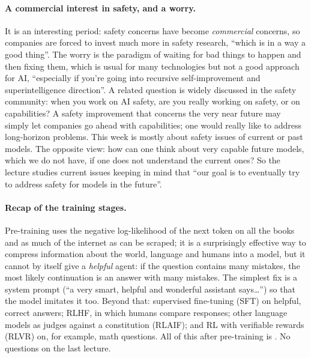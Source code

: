 \paragraph{A commercial interest in safety, and a worry.}
It is an interesting period: safety concerns have become \emph{commercial} concerns, so companies are forced to invest much more in safety research, ``which is in a way a good thing''. The worry is the paradigm of waiting for bad things to happen and then fixing them, which is usual for many technologies but not a good approach for AI, ``especially if you're going into recursive self-improvement and superintelligence direction''.
A related question is widely discussed in the safety community: when you work on AI safety, are you really working on safety, or on capabilities? A safety improvement that concerns the very near future may simply let companies go ahead with capabilities; one would really like to address long-horizon problems. This week is mostly about safety issues of current or past models. The opposite view: how can one think about very capable future models, which we do not have, if one does not understand the current ones? So the lecture studies current issues keeping in mind that ``our goal is to eventually try to address safety for models in the future''.

\paragraph{Recap of the training stages.}
Pre-training uses the negative log-likelihood of the next token on all the books and as much of the internet as can be scraped; it is a surprisingly effective way to compress information about the world, language and humans into a model, but it cannot by itself give a \emph{helpful} agent: if the question contains many mistakes, the most likely continuation is an answer with many mistakes. The simplest fix is a system prompt (``a very smart, helpful and wonderful assistant says\ldots'') so that the model imitates it too. Beyond that: supervised fine-tuning (SFT) on helpful, correct answers; RLHF, in which humans compare responses; other language models as judges against a constitution (RLAIF); and RL with verifiable rewards (RLVR) on, for example, math questions. All of this after pre-training is . No questions on the last lecture.

